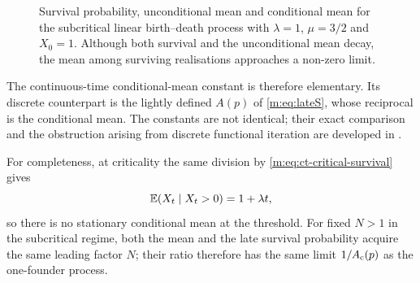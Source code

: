 \begin{figure}[tbp]
  \centering
  \caption{Survival probability, unconditional mean and conditional mean for
  the subcritical linear birth--death process with $\lambda=1$, $\mu=3/2$ and
  $X_0=1$.  Although both survival and the unconditional mean decay, the mean
  among surviving realisations approaches a non-zero limit.}
  \label{m:fig:ct-conditioning}
\end{figure}

The continuous-time conditional-mean constant is therefore elementary.  Its
discrete counterpart is the lightly defined $A(p)$ of \cref{m:eq:lateS}, whose
reciprocal is the conditional mean.  The constants are not identical; their exact
comparison and the obstruction arising from discrete functional iteration are
developed in \ChA.

For completeness, at criticality the same division by
\cref{m:eq:ct-critical-survival} gives
\begin{equation}
  \mathbb{E}\!\left(X_t\mid X_t>0\right)=1+\lambda t,
  \label{m:eq:ct-critical-conditional-mean}
\end{equation}
so there is no stationary conditional mean at the threshold.  For fixed
$N>1$ in the subcritical regime, both the mean and the late survival probability
acquire the same leading factor $N$; their ratio therefore has the same limit
$1/A_{\mathrm{c}}(p)$ as the one-founder process.

